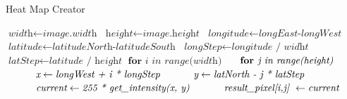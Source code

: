 \documentclass[letterpaper]{article}
\begin{document}
\begin{algorithm}
    \caption{Heat Map Creator}\label{fig:heatMapCreation}
    \begin{algorithmic}[1]
        	 \State $\textit{width} \gets \textit{image.width}$
        	 \State $\textit{height} \gets \textit{image.height}$
        	 \State $\textit{longitude} \gets \textit{longEast-longWest}$
        	 \State $\textit{latitude} \gets \textit{latitudeNorth-latitudeSouth}$
            \State $\textit{longStep} \gets \textit{longitude / widht}$
            \State $\textit{latStep} \gets \textit{latitude / height}$
            \State $\textbf{for } \textit{i in range(width)} $
            \State $\indent \textbf{for } \textit{j in range(height)} $
            \State $\indent \indent \textit{x} \gets \textit{longWest + i * longStep}$
            \State $\indent \indent \textit{y} \gets \textit{latNorth - j * latStep}$
            \State $\indent \indent \textit{current} \gets \textit{255 * get\_intensity(x, y)}$
            \State $\indent \indent \textit{result\_pixel[i,j] } \gets \textit{current}$
        \EndProcedure
    \end{algorithmic}
\end{algorithm}
\end{document}
